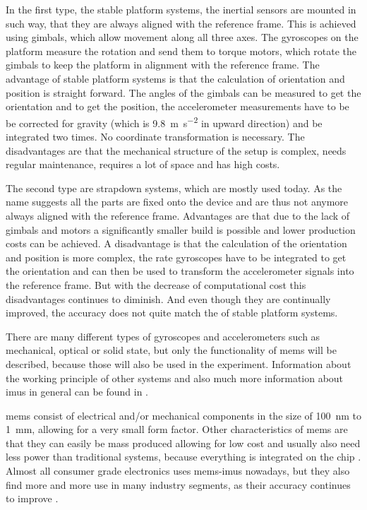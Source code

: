 In the first type, the stable platform systems, the inertial sensors are mounted in such way, that they are always aligned with the reference frame.
This is achieved using gimbals, which allow movement along all three axes.
The gyroscopes on the platform measure the rotation and send them to torque motors, which rotate the gimbals to keep the platform in alignment with the reference frame.
The advantage of stable platform systems is that the calculation of orientation and position is straight forward.
The angles of the gimbals can be measured to get the orientation and to get the position, the accelerometer measurements have to be be corrected for gravity (which is \SI{9.8}{\metre\per\second^2} in upward direction) and be integrated two times.
No coordinate transformation is necessary.
The disadvantages are that the mechanical structure of the setup is complex, needs regular maintenance, requires a lot of space and has high costs.

The second type are strapdown systems, which are mostly used today. 
As the name suggests all the parts are fixed onto the device and are thus not anymore always aligned with the reference frame.
Advantages are that due to the lack of gimbals and motors a significantly smaller build is possible and lower production costs can be achieved.
A disadvantage is that the calculation of the orientation and position is more complex, the rate gyroscopes have to be integrated to get the orientation and can then be used to transform the accelerometer signals into the reference frame.
But with the decrease of computational cost this disadvantages continues to diminish. And even though they are continually improved, the accuracy does not quite match the of stable platform systems.

There are many different types of gyroscopes and accelerometers such as mechanical, optical or solid state, but only the functionality of \acrshort{mems} will be described, because those will also be used in the experiment.
Information about the working principle of other systems and also much more information about \acrshort{imu}s in general can be found in \cite{Woodman07anintroduction}.

\acrshort{mems} consist of electrical and/or mechanical components in the size of \SI{100}{\nano\metre} to \SI{1}{\milli\metre}, allowing for a very small form factor.
Other characteristics of \acrshort{mems} are that they can easily be mass produced allowing for low cost and usually also need less power than traditional systems, because everything is integrated on the chip \cite{Shaeffer2013}.
Almost all consumer grade electronics uses \acrshort{mems}-\acrshort{imu}s nowadays, but they also find more and more use in many industry segments, as their accuracy continues to improve \cite{Perlmutter2016}.


